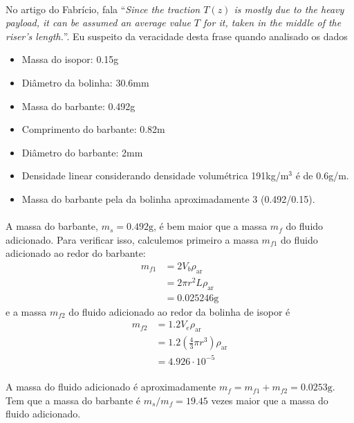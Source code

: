 \documentclass[a4paper,11pt]{scrartcl} %
\numberwithin{equation}{section} %
\numberwithin{figure}{section} %
\numberwithin{table}{section} %
\begin{document}
\paragraph{} No artigo do Fabrício, fala ``\textit{Since the traction $T (z)$ is mostly due to the heavy payload,
it can be assumed an average value $T$ for it, taken in the
            middle of the riser’s length.}''. Eu suspeito da veracidade desta frase quando analisado os dados \begin{itemize}
            	\item Massa do isopor: 0.15g
	\item Diâmetro da bolinha: 30.6mm
	\item Massa do barbante: 0.492g
	\item Comprimento do barbante: 0.82m
	\item Diâmetro do barbante: 2mm
	\item Densidade linear considerando densidade volumétrica 191kg/m$^3$ é de 0.6g/m.
\item Massa do barbante pela da bolinha aproximadamente 3 (0.492/0.15).
            \end{itemize}
         
\paragraph{} A massa do barbante, $m_s = 0.492\mathrm{g}$, é bem maior que a massa $m_f$ do fluido adicionado. Para verificar isso, calculemos primeiro a massa $m_{f1}$ do fluido adicionado ao redor do barbante: \begin{align}
	m_{f1} &= 2 V_b \rho_{\mathrm{ar}}\nonumber\\
	&= 2 \pi r^2 L\rho_{\mathrm{ar}}\nonumber\\
	&= 0.025246\mathrm{g}
\end{align} e a massa $m_{f2}$ do fluido adicionado ao redor da bolinha de isopor é \begin{align}
	m_{f2} &= 1.2 V_{e} \rho_{\mathrm{ar}}\nonumber\\
	&= 1.2 \left(\frac{4}{3}\pi r^3\right)\rho_{\mathrm{ar}}\nonumber\\
	&= 4.926\cdot 10^{-5}
\end{align}

\paragraph{} A massa do fluido adicionado é aproximadamente $m_f = m_{f1} + m_{f2} = 0.0253\mathrm{g}$. Tem que a massa do barbante é $m_s/m_f = 19.45$ vezes maior que a massa do fluido adicionado. 
            
\end{document}
